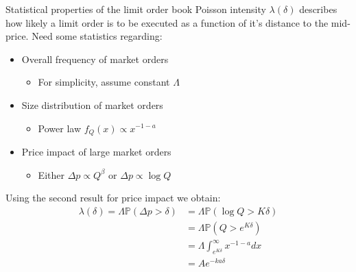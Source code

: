 \documentclass{beamer} %
\begin{document}
\begin{frame}{Statistical properties of the limit order book}
    Poisson intensity $\lambda(\delta)$ describes how likely a limit order is to be executed as a function of it's 
    distance to the mid-price. Need some statistics regarding:
    \begin{itemize}
        \item Overall frequency of market orders
        \begin{itemize}
            \item For simplicity, assume constant $\Lambda$
        \end{itemize}
        \item Size distribution of market orders
        \begin{itemize}
            \item Power law $f_Q(x)\propto x^{-1-a}$
        \end{itemize}
        \item Price impact of large market orders
        \begin{itemize}
            \item Either $\Delta p\propto Q^\beta$ or $\Delta p\propto\log Q$
        \end{itemize}
    \end{itemize}
    Using the second result for price impact we obtain:
    \begin{align*}
        \lambda(\delta)=\Lambda\mathbb{P}(\Delta p>\delta)&=\Lambda\mathbb{P}(\log Q>K\delta)\\
        &=\Lambda\mathbb{P}\left(Q>e^{K\delta}\right)\\
        &=\Lambda\int_{e^{K\delta}}^{\infty}x^{-1-a}dx\\
        &=Ae^{-ka\delta}
    \end{align*}
\end{frame}
\end{document}
